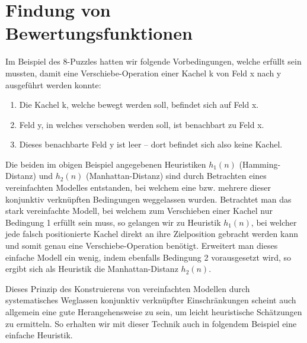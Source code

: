 





\section{Findung von Bewertungsfunktionen}

Im Beispiel des 8-Puzzles hatten wir folgende Vorbedingungen, welche erfüllt sein mussten, damit eine Verschiebe-Operation einer Kachel k von Feld x nach y ausgeführt werden konnte:
\begin{enumerate}
	\item Die Kachel k, welche bewegt werden soll, befindet sich auf Feld x.
	\item Feld y, in welches verschoben werden soll, ist benachbart zu Feld x.
	\item Dieses benachbarte Feld y ist leer -- dort befindet sich also keine Kachel.
\end{enumerate}
Die beiden im obigen Beispiel angegebenen Heuristiken $h_{1}(n)$ (Hamming-Distanz) und $h_{2}(n)$ (Manhattan-Distanz) sind durch Betrachten eines vereinfachten Modelles entstanden, bei welchem eine bzw. mehrere dieser konjunktiv verknüpften Bedingungen weggelassen wurden.
Betrachtet man das stark vereinfachte Modell, bei welchem zum Verschieben einer Kachel nur Bedingung 1 erfüllt sein muss, so gelangen wir zu Heuristik $h_{1}(n)$, bei welcher jede falsch positionierte Kachel direkt an ihre Zielposition gebracht werden kann und somit genau eine Verschiebe-Operation benötigt.
Erweitert man dieses einfache Modell ein wenig, indem ebenfalls Bedingung 2 vorausgesetzt wird, so ergibt sich als Heuristik die Manhattan-Distanz $h_{2}(n)$.

Dieses Prinzip des Konstruierens von vereinfachten Modellen durch systematisches Weglassen konjunktiv verknüpfter Einschränkungen scheint auch allgemein eine gute Herangehensweise zu sein, um leicht heuristische Schätzungen zu ermitteln.
So erhalten wir mit dieser Technik auch in folgendem Beispiel eine einfache Heuristik.

